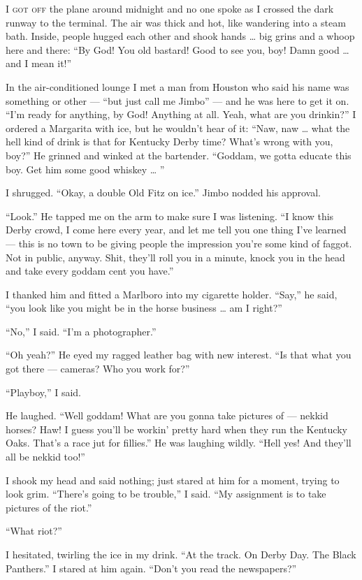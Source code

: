 \documentclass[9pt,a4paper]{extarticle}
\begin{document}
\linenumbers\lettrine[lines=2,lhang=0.05,nindent=0pt]{I}{ got off} the plane around midnight and no one spoke as I crossed the dark runway to the terminal. The air was thick and hot, like wandering into a steam bath. Inside, people hugged each other and shook hands … big grins and a whoop here and there: “By God! You old bastard! Good to see you, boy! Damn good … and I mean it!”

In the air-conditioned lounge I met a man from Houston who said his name was something or other — “but just call me Jimbo” — and he was here to get it on. “I’m ready for anything, by God! Anything at all. Yeah, what are you drinkin?” I ordered a Margarita with ice, but he wouldn’t hear of it: “Naw, naw … what the hell kind of drink is that for Kentucky Derby time? What’s wrong with you, boy?” He grinned and winked at the bartender. “Goddam, we gotta educate this boy. Get him some good whiskey … ”

I shrugged. “Okay, a double Old Fitz on ice.” Jimbo nodded his approval.

“Look.” He tapped me on the arm to make sure I was listening. “I know this Derby crowd, I come here every year, and let me tell you one thing I’ve learned — this is no town to be giving people the impression you’re some kind of faggot. Not in public, anyway. Shit, they’ll roll you in a minute, knock you in the head and take every goddam cent you have.”

I thanked him and fitted a Marlboro into my cigarette holder. “Say,” he said, “you look like you might be in the horse business … am I right?”

“No,” I said. “I’m a photographer.”

“Oh yeah?” He eyed my ragged leather bag with new interest. “Is that what you got there — cameras? Who you work for?”

“Playboy,” I said.

He laughed. “Well goddam! What are you gonna take pictures of — nekkid horses? Haw! I guess you’ll be workin’ pretty hard when they run the Kentucky Oaks. That’s a race jut for fillies.” He was laughing wildly. “Hell yes! And they’ll all be nekkid too!”

I shook my head and said nothing; just stared at him for a moment, trying to look grim. “There’s going to be trouble,” I said. “My assignment is to take pictures of the riot.”

“What riot?”

I hesitated, twirling the ice in my drink. “At the track. On Derby Day. The Black Panthers.” I stared at him again. “Don’t you read the newspapers?”
\end{document}
